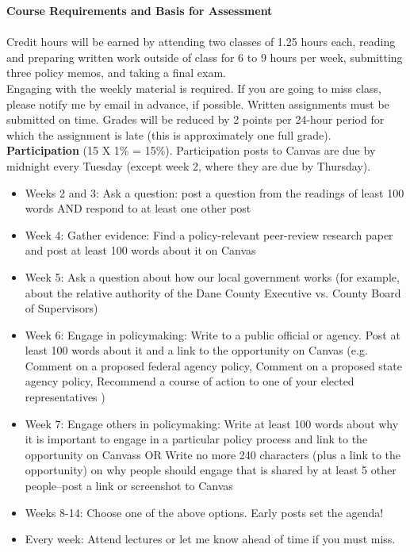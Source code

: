\documentclass[12pt]{article}
\begin{document}
\noindent \Large \textbf{Course Requirements and Basis for Assessment}\normalsize\\
\\
Credit hours will be earned by attending two classes of 1.25 hours each, reading and preparing written work outside of class for 6 to 9 hours per week, submitting three policy memos, and taking a final exam.\\

\noindent Engaging with the weekly material is required.  If you are going to miss class, please notify me by email in advance, if possible.  Written assignments must be submitted on time.  Grades will be reduced by 2 points per 24-hour period for which the assignment is late (this is approximately one full grade).\\

\noindent \textbf{Participation} (15 X 1\% = 15\%).
Participation posts to Canvas are due by midnight every Tuesday (except week 2, where they are due by Thursday).
\begin{itemize}
\item Weeks 2 and 3: Ask a question: post a question from the readings of least 100 words AND respond to at least one other post
\item Week 4: Gather evidence: Find a policy-relevant peer-review research paper and post at least 100 words about it on Canvas
\item Week 5: Ask a question about how our local government works (for example, about the relative authority of the Dane County Executive vs. County Board of Supervisors)
\item Week 6: Engage in policymaking: Write to a public official or agency. Post at least 100 words about it and a link to the opportunity on Canvas (e.g. Comment on a proposed federal agency policy, Comment on a proposed state agency policy, Recommend a course of action to one of your elected representatives )
\item Week 7: Engage others in policymaking: Write at least 100 words about why it is important to engage in a particular policy process and link to the opportunity on Canvass OR Write no more 240 characters (plus a link to the opportunity) on why people should engage that is shared by at least 5 other people–post a link or screenshot to Canvas
\item Weeks 8-14: Choose one of the above options. Early posts set the agenda!
\item Every week: Attend lectures or let me know ahead of time if you must miss.
\end{itemize}
\end{document}
